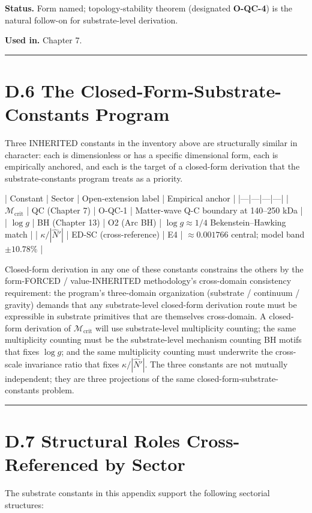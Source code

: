 \documentclass[11pt]{book}
\begin{document}
\textbf{Status.} Form named; topology-stability theorem (designated \textbf{O-QC-4}) is the natural follow-on for substrate-level derivation.

\textbf{Used in.} Chapter 7.

\bigskip\hrule\bigskip

\section{D.6 The Closed-Form-Substrate-Constants Program}

Three INHERITED constants in the inventory above are structurally similar in character: each is dimensionless or has a specific dimensional form, each is empirically anchored, and each is the target of a closed-form derivation that the substrate-constants program treats as a priority.

| Constant | Sector | Open-extension label | Empirical anchor |
|---|---|---|---|
| $\mathcal{M}_\mathrm{crit}$ | QC (Chapter 7) | O-QC-1 | Matter-wave Q-C boundary at 140–250 kDa |
| $\log g$ | BH (Chapter 13) | O2 (Arc BH) | $\log g \approx 1/4$ Bekenstein–Hawking match |
| $\kappa/|\hat{N}'|$ | ED-SC (cross-reference) | E4 | $\approx 0.001766$ central; model band $\pm 10.78\%$ |

Closed-form derivation in any one of these constants constrains the others by the form-FORCED / value-INHERITED methodology's cross-domain consistency requirement: the program's three-domain organization (substrate / continuum / gravity) demands that any substrate-level closed-form derivation route must be expressible in substrate primitives that are themselves cross-domain. A closed-form derivation of $\mathcal{M}_\mathrm{crit}$ will use substrate-level multiplicity counting; the same multiplicity counting must be the substrate-level mechanism counting BH motifs that fixes $\log g$; and the same multiplicity counting must underwrite the cross-scale invariance ratio that fixes $\kappa/|\hat{N}'|$. The three constants are not mutually independent; they are three projections of the same closed-form-substrate-constants problem.

\bigskip\hrule\bigskip

\section{D.7 Structural Roles Cross-Referenced by Sector}

The substrate constants in this appendix support the following sectorial structures:
\end{document}
